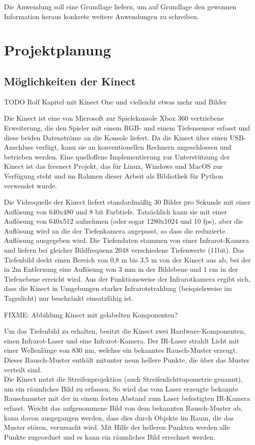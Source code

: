 \documentclass[12pt,a4paper,ngerman]{scrartcl}
\begin{document}
Die Anwendung soll eine Grundlage liefern, um auf Grundlage den gewonnen Information
heraus konkrete weitere Anwendungen zu schreiben.


\section{Projektplanung}

\subsection{Möglichkeiten der Kinect}

{\color{red} TODO Rolf Kapitel mit Kinect One und vielleicht etwas mehr und Bilder}

Die Kinect ist eine von Microsoft zur Spielekonsole Xbox 360 vertriebene Erweiterung,
die den Spieler mit einem RGB- und einem Tiefensensor erfasst und diese beiden
Datenströme an die Konsole liefert. Da die Kinect über einen USB-Anschluss verfügt,
kann sie an konventionellen Rechnern angeschlossen und betrieben werden. Eine
quelloffene Implementierung zur Unterstützung der Kinect ist das freenect Projekt,
das für Linux, Windows und MacOS zur Verfügung steht und im Rahmen dieser Arbeit
als Bibliothek für Python verwendet wurde.\cite{openkinect}\cite{libfreenect}

Die Videoquelle der Kinect liefert standardmäßig 30 Bilder pro Sekunde mit einer
Auflösung von 640x480 und 8 bit Farbtiefe. Tatsächlich kann sie mit
einer Auflösung von 640x512 aufnehmen (oder sogar 1280x1024 und 10 fps), aber die
Auflösung wird an die der Tiefenkamera angepasst, so dass die reduzierte Auflösung
ausgegeben wird. Die Tiefendaten stammen von einer
Infrarot-Kamera und liefern bei gleicher Bildfrequenz 2048 verschiedene
Tiefenwerte (11bit). Das Tiefenbild deckt einen Bereich von 0,8 m bis 3,5 m von der
Kinect aus ab, bei der in 2m Entfernung eine Auflösung von 3 mm in der Bildebene und
1 cm in der Tiefenebene erreicht wird. Aus der Funktionsweise der Infrarotkamera
ergibt sich, dass die Kinect in Umgebungen starker Infrarotstrahlung (beispielsweise
im Tageslicht) nur beschränkt einsatzfähig ist.\cite{hacking}

{\color{red} FIXME: Abbildung Kinect mit gelabelten Komponenten?}

Um das Tiefenbild zu erhalten, besitzt die Kinect zwei Hardware-Komponenten, einen
Infrarot-Laser und eine Infrarot-Kamera. Der IR-Laser strahlt Licht mit einer Wellenlänge
von 830 nm, welches ein bekanntes Rausch-Muster erzeugt. Dieses Rausch-Muster enthält
mitunter neun hellere Punkte, die über das Muster verteilt sind.\\
Die Kinect nutzt die Streifenprojektion (auch Streifenlichttopometrie genannt), um ein
räumliches Bild zu erfassen. So wird das vom Laser erzeugte bekannte Rauschmuster mit der
in einem festen Abstand zum Laser befestigten IR-Kamera erfasst. Weicht das aufgenommene
Bild von dem bekannten Rausch-Muster ab, kann davon ausgegangen werden, dass dies durch
Objekte im Raum, die das Muster stören, verursacht wird. Mit Hilfe der helleren Punkten werden
alle Punkte zugeordnet und es kann ein räumliches Bild errechnet werden.
\end{document}

